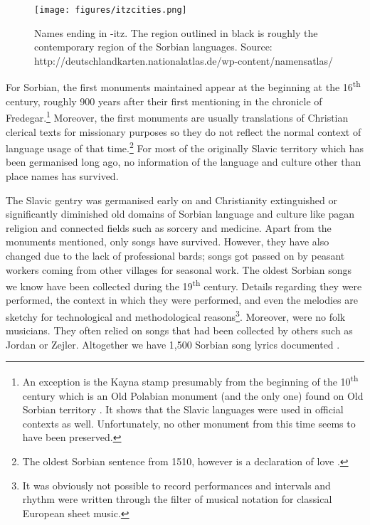 \documentclass[output=paper,hidelinks]{langscibook}
\begin{document}
\begin{figure}
\texttt{[image: figures/itzcities.png]}
\caption{Names ending in -itz. The region outlined in black is roughly the contemporary region of the Sorbian languages. Source: http://deutschlandkarten.nationalatlas.de/wp-content/namensatlas/}\label{fig:werner:2}
\end{figure}

 
For Sorbian, the first monuments maintained appear at the beginning at the 16\textsuperscript{th} century, roughly 900 years after their first mentioning in the chronicle of Fredegar.\footnote{An exception is the Kayna stamp presumably from the beginning of the 10\textsuperscript{th} century which is an Old Polabian monument (and the only one) found on Old Sorbian territory \citep{Werner2004}. It shows that the Slavic languages were used in official contexts as well. Unfortunately, no other monument from this time seems to have been preserved.} Moreover, the first monuments are usually translations of Christian clerical texts for missionary purposes so they do not reflect the normal context of language usage of that time.\footnote{The oldest Sorbian sentence from 1510, however is a declaration of love \citep{Wornar2014}.} For most of the originally Slavic territory which has been germanised long ago, no information of the language and culture other than place names has survived. 
 

 
The Slavic gentry was germanised early on and Christianity extinguished or significantly diminished old domains of Sorbian language and culture like pagan religion and connected fields such as sorcery and medicine. Apart from the monuments mentioned, only songs have survived. However, they have also changed due to the lack of professional bards; songs got passed on by peasant workers coming from other villages for seasonal work. The oldest Sorbian songs we know have been collected during the 19\textsuperscript{th} century. Details regarding they were performed, the context in which they were performed, and even the melodies are sketchy \citep[199]{Nedo1966} for technological and methodological reasons\footnote{It was obviously not possible to record performances and intervals and rhythm were written through the filter of musical notation for classical European sheet music.}. Moreover, \citet{HauptSmoler1843} were no folk musicians. They often relied on songs that had been collected by others such as Jordan or Zejler. Altogether we have 1,500 Sorbian song lyrics documented \citep[176]{Nedo1966}.
 
\end{document}
